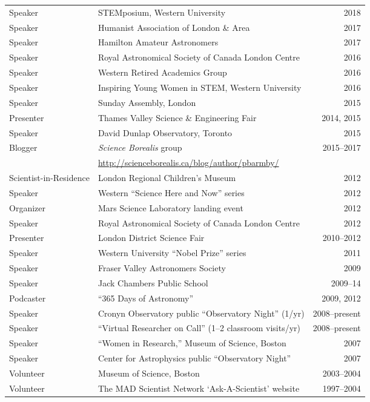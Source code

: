 \begin{tabularx}{\textwidth}{lXr}
Speaker &  STEMposium, Western University& 2018\\
Speaker & Humanist Association of London \& Area & 2017\\
Speaker & Hamilton Amateur Astronomers & 2017\\
Speaker& Royal Astronomical Society of Canada London Centre& 2016\\
Speaker& Western Retired Academics Group& 2016\\
Speaker &  Inspiring Young Women in STEM, Western University & 2016\\
Speaker & Sunday Assembly, London  & 2015\\
Presenter& Thames Valley Science \& Engineering Fair& 2014, 2015\\
Speaker & David Dunlap Observatory, Toronto& 2015\\
Blogger & {\it Science Borealis} group& 2015--2017\\
&  \url{http://scienceborealis.ca/blog/author/pbarmby/}  & \\
Scientist-in-Residence& London Regional Children's Museum& 2012\\
Speaker& Western ``Science Here and Now'' series& 2012\\
Organizer& Mars Science Laboratory landing event& 2012\\
Speaker& Royal Astronomical Society of Canada London Centre& 2012\\
Presenter& London District Science Fair& 2010--2012\\
Speaker& Western University ``Nobel Prize'' series& 2011\\
Speaker& Fraser Valley Astronomers Society& 2009\\
Speaker& Jack Chambers Public School& 2009--14\\
Podcaster &  ``365 Days of Astronomy''  &2009, 2012\\
Speaker& Cronyn Observatory public ``Observatory Night'' (1/yr)& 2008--present\\
Speaker& ``Virtual Researcher on Call''  (1--2 classroom visits/yr) & 2008--present\\
Speaker & ``Women in Research,''  Museum of Science, Boston& 2007\\
Speaker& Center for Astrophysics public ``Observatory Night'' & 2007\\
Volunteer& Museum of Science, Boston& 2003--2004\\
Volunteer& The MAD Scientist Network `Ask-A-Scientist' website& 1997--2004\\
\end{tabularx}
